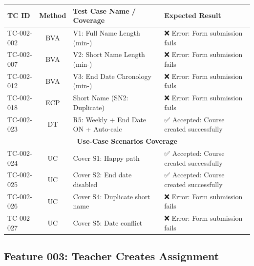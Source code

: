\documentclass[twoside,final]{hcmut-report}
\begin{document}
\begin{table}[H]
\centering
\renewcommand{\arraystretch}{1.2}
\begin{tabularx}{\textwidth}{|l|c|X|X|}
\hline
\textbf{TC ID} & \textbf{Method} & \textbf{Test Case Name / Coverage} & \textbf{Expected Result} \\ \hline
TC-002-002 & BVA & V1: Full Name Length (min-) & ❌ Error: Form submission fails \\ \hline
TC-002-007 & BVA & V2: Short Name Length (min-) & ❌ Error: Form submission fails \\ \hline
TC-002-012 & BVA & V3: End Date Chronology (min-) & ❌ Error: Form submission fails \\ \hline
TC-002-018 & ECP & Short Name (SN2: Duplicate) & ❌ Error: Form submission fails \\ \hline
TC-002-023 & DT  & R5: Weekly + End Date ON + Auto-calc & ✅ Accepted: Course created successfully \\ \hline
\multicolumn{4}{|c|}{\cellcolor{gray!20}\textbf{Use-Case Scenarios Coverage}} \\ \hline
TC-002-024 & UC & Cover S1: Happy path & ✅ Accepted: Course created successfully \\ \hline
TC-002-025 & UC & Cover S2: End date disabled & ✅ Accepted: Course created successfully \\ \hline
TC-002-026 & UC & Cover S4: Duplicate short name & ❌ Error: Form submission fails \\ \hline
TC-002-027 & UC & Cover S5: Date conflict & ❌ Error: Form submission fails \\ \hline
\end{tabularx}
\end{table}

\subsection{Feature 003: Teacher Creates Assignment}
\end{document}
